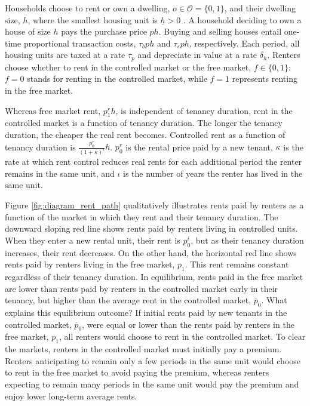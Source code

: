 \documentclass[parskip=full]{article}
\begin{document}
Households choose to rent or own a dwelling, $o \in \mathcal{O}=\{0,1\}$, and their dwelling size, $h$, where the smallest housing unit is $\underline{h}>0$ \citep{gervais,sommeretal-2013,sommersullivan-2017,kaplanetal-2019}. A household deciding to own a house of size $h$ pays the purchase price $p h$. Buying and selling houses entail one-time proportional transaction costs, $\tau_{b} p h$ and $\tau_{s} p h$, respectively. Each period, all housing units are taxed at a rate $\tau_{p}$ and depreciate in value at a rate $\delta_h$. Renters choose whether to rent in the controlled market or the free market, $f \in \{0,1\}$: $f=0$ stands for renting in the controlled market, while $f=1$ represents renting in the free market. 

Whereas free market rent, $p^{r}_{1}h$, is independent of tenancy duration, rent in the controlled market is a function of tenancy duration. The longer the tenancy duration, the cheaper the real rent becomes. Controlled rent as a function of tenancy duration is $\frac{p^{r}_{0}}{(1+\kappa)^{\iota}} h$. $p^{r}_{0}$ is the rental price paid by a new tenant, $\kappa$ is the rate at which rent control reduces real rents for each additional period the renter remains in the same unit, and $\iota$ is the number of years the renter has lived in the same unit. 

Figure \ref{fig:diagram_rent_path} qualitatively illustrates rents paid by renters as a function of the market in which they rent and their tenancy duration. The downward sloping red line shows rents paid by renters living in controlled units. When they enter a new rental unit, their rent is $p^{i}_{0}$, but as their tenancy duration increases, their rent decreases. On the other hand, the horizontal red line shows rents paid by renters living in the free market, $p_{1}$. This rent remains constant regardless of their tenancy duration. In equilibrium, rents paid in the free market are lower than rents paid by renters in the controlled market early in their tenancy, but higher than the average rent in the controlled market, $\overline{p}_{0}$. What explains this equilibrium outcome? If initial rents paid by new tenants in the controlled market, $\overline{p}_{0}$, were equal or lower than the rents paid by renters in the free market, $p_{1}$, all renters would choose to rent in the controlled market. To clear the markets, renters in the controlled market must initially pay a premium. Renters anticipating to remain only a few periods in the same unit would choose to rent in the free market to avoid paying the premium, whereas renters expecting to remain many periods in the same unit would pay the premium and enjoy lower long-term average rents.
\end{document}
